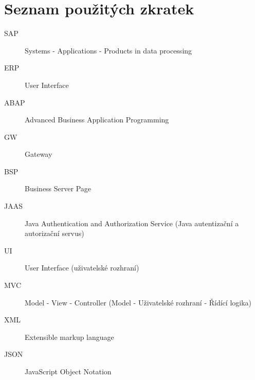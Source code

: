 \documentclass[thesis=M,czech]{FITthesis}[2012/06/26]
\begin{document}



\appendix

\chapter{Seznam použitých zkratek}
\begin{description}
	\item[SAP] Systems - Applications - Products in data processing
	\item[ERP] User Interface
	\item[ABAP] Advanced Business Application Programming
	\item[GW] Gateway 
	\item[BSP] Business Server Page 
	\item[JAAS] Java Authentication and Authorization Service (Java autentizační a autorizační servus)
	\item[UI] User Interface (uživatelské rozhraní)
	\item[MVC] Model - View - Controller (Model - Uživatelské rozhraní - Řídící logika)
	\item[XML] Extensible markup language
	\item[JSON] JavaScript Object Notation
\end{description}
\end{document}
